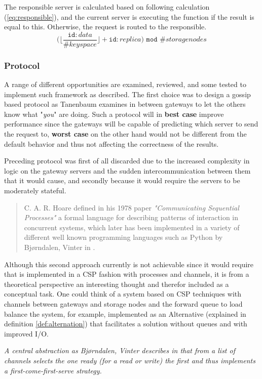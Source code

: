 The responsible server is calculated based on following calculation (\ref{eq:responsible}), and the current server is executing the function if the result is equal to this. Otherwise, the request is routed to the responsible.
\begin{equation} \label{eq:responsible}
\Big(\Big\lfloor\dfrac{\texttt{id}:data}{\texttt{\#}keyspace}\Big\rfloor + \texttt{id}:replica\Big) \texttt{ mod } \texttt{\#}storagenodes
\end{equation}

\subsubsection*{Protocol}
A range of different opportunities are examined, reviewed, and some tested to implement such framework as described. The first choice was to design a gossip based protocol as Tanenbaum \etal examines in \cite{Tanenbaum:2006:DSP:1202502} between gateways to let the others know what "\textit{you}" are doing. Such a protocol will in \textbf{best case} improve performance since the gateways will be capable of predicting which server to send the request to, \textbf{worst case} on the other hand would not be different from the default behavior and thus not affecting the correctness of the results.
\newline

Preceding protocol was first of all discarded due to the increased complexity in logic on the gateway servers and the sudden intercommunication between them that it would cause, and secondly because it would require the servers to be moderately stateful.

\begin{quotation}
C. A. R. Hoare defined in his 1978 paper \textit{"Communicating Sequential Processes"}\cite{Hoare:1978:CSP:359576.359585} a formal language for describing patterns of interaction in concurrent systems, which later has been implemented in a variety of different well known programming languages such as Python by Bj{\o}rndalen, Vinter \etal in \cite{bjorndalen2007pycsp}.
\end{quotation}

\noindent
Although this second approach currently is not achievable since it would require that \CodeName is implemented in a CSP fashion with processes and channels, it is from a theoretical perspective an interesting thought and therefor included as a conceptual task. One could think of a \CodeName system based on CSP techniques with channels between gateways and storage nodes and the forward queue to load balance the system, for example, implemented as an Alternative (explained in definition \ref{def:alternation}) that facilitates a solution without queues and with improved I/O.
\vspace*{3mm}
\begin{definition} \label{def:alternation}
\textit{A central abstraction as Bj{\o}rndalen, Vinter \etal describes in \cite{bjorndalen2007pycsp} that from a list of channels selects the one ready (for a read or write) the first and thus implements a first-come-first-serve strategy.}
\end{definition}


